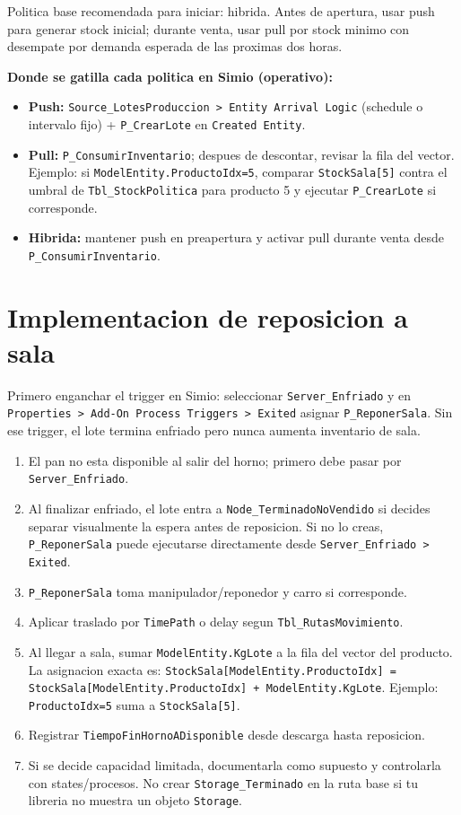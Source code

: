 \documentclass[11pt]{article}
\newcommand{\simio}[1]{\texttt{#1}}
\newcommand{\tabla}[1]{\texttt{#1}}
\newcommand{\state}[1]{\texttt{#1}}
\newcommand{\proc}[1]{\texttt{#1}}
\newcommand{\resp}[1]{\texttt{#1}}
\begin{document}
Politica base recomendada para iniciar: hibrida. Antes de apertura, usar push para generar stock inicial; durante venta, usar pull por stock minimo con desempate por demanda esperada de las proximas dos horas.

\textbf{Donde se gatilla cada politica en Simio (operativo):}
\begin{itemize}
  \item \textbf{Push:} \simio{Source\_LotesProduccion > Entity Arrival Logic} (schedule o intervalo fijo) + \proc{P\_CrearLote} en \simio{Created Entity}.
  \item \textbf{Pull:} \proc{P\_ConsumirInventario}; despues de descontar, revisar la fila del vector. Ejemplo: si \state{ModelEntity.ProductoIdx=5}, comparar \state{StockSala[5]} contra el umbral de \tabla{Tbl\_StockPolitica} para producto 5 y ejecutar \proc{P\_CrearLote} si corresponde.
  \item \textbf{Hibrida:} mantener push en preapertura y activar pull durante venta desde \proc{P\_ConsumirInventario}.
\end{itemize}

\section{Implementacion de reposicion a sala}

Primero enganchar el trigger en Simio: seleccionar \simio{Server\_Enfriado} y en
\simio{Properties > Add-On Process Triggers > Exited} asignar \proc{P\_ReponerSala}.
Sin ese trigger, el lote termina enfriado pero nunca aumenta inventario de sala.

\begin{enumerate}
  \item El pan no esta disponible al salir del horno; primero debe pasar por \simio{Server\_Enfriado}.
  \item Al finalizar enfriado, el lote entra a \simio{Node\_TerminadoNoVendido} si decides separar visualmente la espera antes de reposicion. Si no lo creas, \proc{P\_ReponerSala} puede ejecutarse directamente desde \simio{Server\_Enfriado > Exited}.
  \item \proc{P\_ReponerSala} toma manipulador/reponedor y carro si corresponde.
  \item Aplicar traslado por \simio{TimePath} o delay segun \tabla{Tbl\_RutasMovimiento}.
  \item Al llegar a sala, sumar \state{ModelEntity.KgLote} a la fila del vector del producto. La asignacion exacta es: \state{StockSala[ModelEntity.ProductoIdx] = StockSala[ModelEntity.ProductoIdx] + ModelEntity.KgLote}. Ejemplo: \state{ProductoIdx=5} suma a \state{StockSala[5]}.
  \item Registrar \resp{TiempoFinHornoADisponible} desde descarga hasta reposicion.
  \item Si se decide capacidad limitada, documentarla como supuesto y controlarla con states/procesos. No crear \simio{Storage\_Terminado} en la ruta base si tu libreria no muestra un objeto \simio{Storage}.
\end{enumerate}
\end{document}
